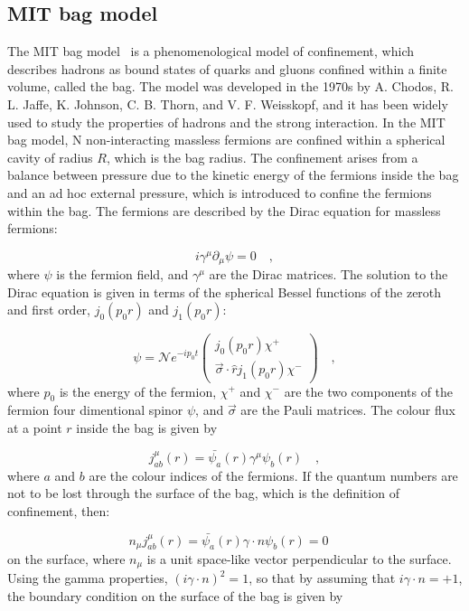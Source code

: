 \subsection{MIT bag model}
The MIT bag model~\cite{Johnson:1975zp} is a phenomenological model of confinement, which describes hadrons as bound states of quarks and gluons confined within a finite volume, called the bag. The model was developed in the 1970s by A. Chodos, R. L. Jaffe, K. Johnson, C. B. Thorn, and V. F. Weisskopf, and it has been widely used to study the properties of hadrons and the strong interaction. In the MIT bag model, N non-interacting massless fermions are confined within a spherical cavity of radius $R$, which is the bag radius. The confinement arises from a balance between pressure due to the kinetic energy of the fermions inside the bag and an ad hoc external pressure, which is introduced to confine the fermions within the bag. The fermions are described by the Dirac equation for massless fermions:

\begin{equation*}
    i\gamma^\mu\partial_\mu\psi = 0\quad ,
\end{equation*}
where $\psi$ is the fermion field, and $\gamma^\mu$ are the Dirac matrices. The solution to the Dirac equation is given in terms of the spherical Bessel functions of the zeroth and first order, $j_0(p_0r)$ and $j_1(p_0r)$:

\begin{equation*}
    \psi = \mathcal{N} e^{-ip_0t} \begin{pmatrix} j_0(p_0r)\chi^+ \\ \vec{\sigma}\cdot\hat{r}j_1(p_0r)\chi^-\end{pmatrix}\quad ,
\end{equation*}
where $p_0$ is the energy of the fermion, $\chi^+$ and $\chi^-$ are the two components of the fermion four dimentional spinor $\psi$, and $\vec{\sigma}$ are the Pauli matrices. The colour flux at a point $r$ inside the bag is given by

\begin{equation*}
    j_{ab}^\mu(r) = \bar{\psi_a}(r)\gamma^\mu\psi_b(r)\quad ,
\end{equation*}
where $a$ and $b$ are the colour indices of the fermions. If the quantum numbers are not to be lost through the surface of the bag, which is the definition of confinement, then:

\begin{equation*}
  n_\mu j_{ab}^\mu(r) = \bar{\psi_a}(r)\gamma\cdot n \psi_b(r) = 0\quad 
\end{equation*}
on the surface, where $n_\mu$ is a unit space-like vector perpendicular to the surface. Using the gamma properties, $(i\gamma\cdot n)^2 = 1$, so that by assuming that $i\gamma\cdot n = + 1$, the boundary condition on the surface of the bag is given by

